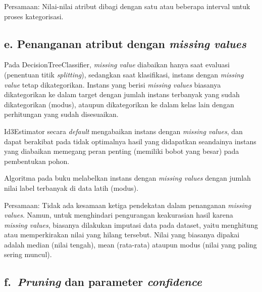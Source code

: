 \documentclass[11pt]{article}
\begin{document}
Persamaan: Nilai-nilai atribut dibagi dengan satu atau beberapa interval
untuk proses kategorisasi.

    \hypertarget{e.-penanganan-atribut-dengan-missing-values}{%
\subsection{\texorpdfstring{e. Penanganan atribut dengan \emph{missing
values}}{e. Penanganan atribut dengan missing values}}\label{e.-penanganan-atribut-dengan-missing-values}}

    Pada DecisionTreeClassifier, \emph{missing value} diabaikan hanya saat
evaluasi (penentuan titik \emph{splitting}), sedangkan saat klasifikasi,
instans dengan \emph{missing value} tetap dikategorikan. Instans yang
berisi \emph{missing values} biasanya dikategorikan ke dalam target
dengan jumlah instans terbanyak yang sudah dikategorikan (modus),
ataupun dikategorikan ke dalam kelas lain dengan perhitungan yang sudah
disesuaikan.

Id3Estimator secara \emph{default} mengabaikan instans dengan
\emph{missing values}, dan dapat berakibat pada tidak optimalnya hasil
yang didapatkan seandainya instans yang diabaikan memegang peran penting
(memiliki bobot yang besar) pada pembentukan pohon.

Algoritma pada buku melabelkan instans dengan \emph{missing values}
dengan jumlah nilai label terbanyak di data latih (modus).

Persamaan: Tidak ada kesamaan ketiga pendekatan dalam penanganan
\emph{missing values}. Namun, untuk menghindari pengurangan keakurasian
hasil karena \emph{missing values}, biasanya dilakukan imputasi data
pada dataset, yaitu menghitung atau memperkirakan nilai yang hilang
tersebut. Nilai yang biasanya dipakai adalah median (nilai tengah), mean
(rata-rata) ataupun modus (nilai yang paling sering muncul).

    \hypertarget{f.-pruning-dan-parameter-confidence}{%
\subsection{\texorpdfstring{f.~\emph{Pruning} dan parameter
\emph{confidence}}{f.~Pruning dan parameter confidence}}\label{f.-pruning-dan-parameter-confidence}}
\end{document}
